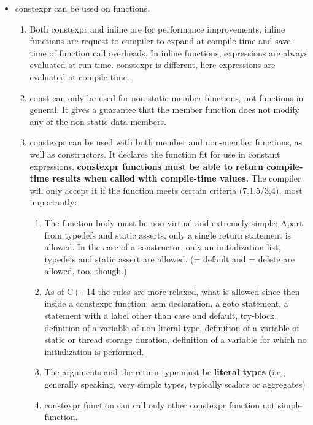 \documentclass[a4paper,12pt,twoside]{book}
\begin{document}
\begin{itemize}
     \item constexpr can be used on functions.
     
     \begin{enumerate}
         \item Both constexpr and inline are for performance improvements, inline functions are request to compiler to expand at compile time and save time of function call overheads. In inline functions, expressions are always evaluated at run time. constexpr is different, here expressions are evaluated at compile time.
         
         \item const can only be used for non-static member functions, not functions in general. It gives a guarantee that the member function does not modify any of the non-static data members.

         
         \item constexpr can be used with both member and non-member functions, as well as constructors. It declares the function fit for use in constant expressions. \textbf{constexpr functions must be able to return compile-time results when called with compile-time values.} The compiler will only accept it if the function meets certain criteria (7.1.5/3,4), most importantly: 
         \begin{enumerate}
             \item The function body must be non-virtual and extremely simple: Apart from typedefs and static asserts, only a single return statement is allowed. In the case of a constructor, only an initialization list, typedefs and static assert are allowed. (= default and = delete are allowed, too, though.)
             
             \item As of C++14 the rules are more relaxed, what is allowed since then inside a constexpr function: asm declaration, a goto statement, a statement with a label other than case and default, try-block, definition of a variable of non-literal type, definition of a variable of static or thread storage duration, definition of a variable for which no initialization is performed.
             
             \item The arguments and the return type must be \textbf{literal types} (i.e., generally speaking, very simple types, typically scalars or aggregates)
             
             \item constexpr function can call only other constexpr function not simple function.
             

\end{enumerate}
\end{enumerate}
\end{itemize}
\end{document}

